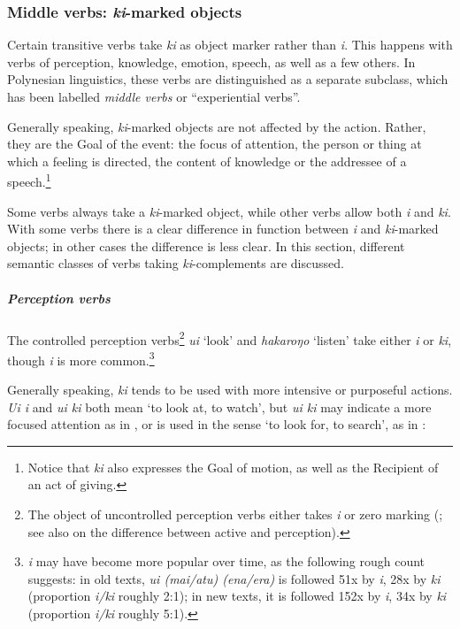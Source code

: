 \subsubsection[Middle verbs: ki{}-marked objects]{Middle verbs: \textit{ki}{}-marked objects}\label{sec:8.6.4.2}
Certain transitive verbs take \textit{ki} as object marker rather than \textit{i}. This happens with verbs of perception, knowledge, emotion, speech, as well as a few others. In Polynesian linguistics, these verbs are distinguished as a separate subclass, which has been labelled \textit{middle verbs} or “experiential verbs”.

Generally speaking, \textit{ki}{}-marked objects are not affected by the action. Rather, they are the Goal of the event: the focus of attention, the person or thing at which a feeling is directed, the content of knowledge or the addressee of a speech.\footnote{\label{fn:433}Notice that \textit{ki} also expresses the Goal of motion, as well as the Recipient of an act of giving.} 

Some verbs always take a \textit{ki}{}-marked object, while other verbs allow both \textit{i} and \textit{ki}. With some verbs there is a clear difference in function between \textit{i} and \textit{ki}{}-marked objects; in other cases the difference is less clear. In this section, different semantic classes of verbs taking \textit{ki}{}-complements are discussed.

\subparagraph{Perception verbs} The controlled perception verbs\footnote{\label{fn:434}The object of uncontrolled perception verbs either takes \textit{i} or zero marking (; see also  on the difference between active and  perception).} \textit{u{\ꞌ}i} ‘look’ and \textit{hakaroŋo} ‘listen’ take either \textit{i} or \textit{ki}, though \textit{i} is more common.\footnote{\label{fn:435}\textit{i} may have become more popular over time, as the following rough count suggests: in old texts, \textit{u{\ꞌ}i (mai/atu) (ena/era)} is followed 51x by \textit{i}, 28x by \textit{ki} (proportion \textit{i/ki} roughly 2:1); in new texts, it is followed 152x by \textit{i}, 34x by \textit{ki} (proportion \textit{i/ki} roughly 5:1).} 

Generally speaking, \textit{ki} tends to be used with more intensive or purposeful actions. \textit{\mbox{U{\ꞌ}i} i} and \textit{u{\ꞌ}i ki} both mean ‘to look at, to watch’, but \textit{u{\ꞌ}i ki} may indicate a more focused attention as in , or is used in the sense ‘to look for, to search’, as in :

